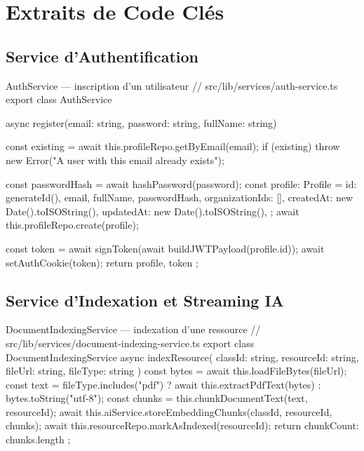 \documentclass[12pt, a4paper, twoside]{report}
\begin{document}
\appendix
\chapter{Extraits de Code Clés}

\section{Service d'Authentification}

\begin{codesnap}[TypeScript]{AuthService — inscription d'un utilisateur}
// src/lib/services/auth-service.ts
export class AuthService {
  async register(email: string, password: string, fullName: string) {
    const existing = await this.profileRepo.getByEmail(email);
    if (existing) throw new Error("A user with this email already exists");

    const passwordHash = await hashPassword(password);
    const profile: Profile = {
      id: generateId(),
      email,
      fullName,
      passwordHash,
      organizationIds: [],
      createdAt: new Date().toISOString(),
      updatedAt: new Date().toISOString(),
    };
    await this.profileRepo.create(profile);

    const token = await signToken(await buildJWTPayload(profile.id));
    await setAuthCookie(token);
    return { profile, token };
  }
}
\end{codesnap}

\section{Service d'Indexation et Streaming IA}

\begin{codesnap}[TypeScript]{DocumentIndexingService — indexation d'une ressource}
// src/lib/services/document-indexing-service.ts
export class DocumentIndexingService {
  async indexResource(
    classId: string,
    resourceId: string,
    fileUrl: string,
    fileType: string
  ) {
    const bytes = await this.loadFileBytes(fileUrl);
    const text = fileType.includes("pdf")
      ? await this.extractPdfText(bytes)
      : bytes.toString("utf-8");
    const chunks = this.chunkDocumentText(text, resourceId);
    await this.aiService.storeEmbeddingChunks(classId, resourceId, chunks);
    await this.resourceRepo.markAsIndexed(resourceId);
    return { chunkCount: chunks.length };
  }
}
\end{codesnap}
\end{document}
